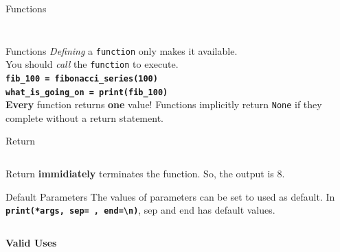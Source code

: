         \begin{frame}{Functions}
            \inputminted[frame=single,framesep=2pt]{python3}{code-examples/function_ex.py}
            \pause
            \inputminted[frame=single,framesep=2pt]{python3}{code-examples/function_ex2.py}
        \end{frame}

        \begin{frame}{Functions}
            \LARGE
            \textit{Defining} a \texttt{function} only makes it available.\\
            \pause 
            You should \textit{call} the \texttt{function} to execute.\\           
            \pause
            \newline
            \textbf{\texttt{fib\_100 = fibonacci\_series(100)}}\\
            \pause
            \textbf{\texttt{what\_is\_going\_on = print(fib\_100)}}\\
            \newline
            \pause
            \textbf{Every} function returns \textbf{one} value! \pause Functions implicitly return \texttt{None} if they complete without a return statement.
        \end{frame}

        \begin{frame}{Return}
            \LARGE
            \pause
            \inputminted[frame=single,framesep=2pt]{python3}{code-examples/return.py}
            \pause
            Return \textbf{immidiately} terminates the function. So, the output is 8.
        \end{frame}

        \begin{frame}{Default Parameters}
            The values of parameters can be set to used as default.
            \newline
            In \textbf{\texttt{print(*args, sep=\textquotesingle \ \textquotesingle, end=\textquotesingle \textbackslash n\textquotesingle )}}, 
            sep and end has default values.
            \pause
            \inputminted[frame=single,framesep=2pt, lastline=15]{python3}{code-examples/default.py}
            \textbf{Valid Uses}
            \begin{columns}
                \begin{column}{0.50\textwidth}
                    \pause
                    \inputminted[frame=single,framesep=2pt, lastline=15]{python3}{code-examples/valid1.py}  
                \end{column}
                \begin{column}{0.50\textwidth}
                    \pause
                    \inputminted[frame=single,framesep=2pt, lastline=15]{python3}{code-examples/valid1_1.py}                    
                \end{column}
            \end{columns}
        \end{frame}

